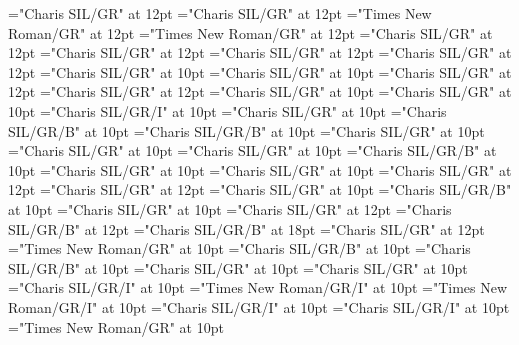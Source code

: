 \documentclass[a4paper,twoside]{article}
\begin{document}
\pagestyle{plain}
\sloppy
\setlength{\parfillskip}{0pt plus 1fil}
\font\diven="Charis SIL/GR" at 12pt
\font\spanen="Charis SIL/GR" at 12pt
\font\divpt="Times New Roman/GR" at 12pt
\font\spanpt="Times New Roman/GR" at 12pt
\font\divseh="Charis SIL/GR" at 12pt
\font\spanseh="Charis SIL/GR" at 12pt
\font\divsehfonipaxetic="Charis SIL/GR" at 12pt
\font\spansehfonipaxetic="Charis SIL/GR" at 12pt
\font\xitemen="Charis SIL/GR" at 10pt
\font\xitemxitemcomplexformrefsbefore="Charis SIL/GR" at 10pt
\font\xitemxitemdefinitionbefore="Charis SIL/GR" at 12pt
\font\xitemxitemdefinitionLcbefore="Charis SIL/GR" at 12pt
\font\xitemxitementryrefcomponentbefore="Charis SIL/GR" at 10pt
\font\xitemxitementryreftypebefore="Charis SIL/GR" at 10pt
\font\xitemxitemexamplebefore="Charis SIL/GR/I" at 10pt
\font\xitemxitemexamplesbefore="Charis SIL/GR" at 10pt
\font\xitemxitemheadwordbefore="Charis SIL/GR/B" at 10pt
\font\xitemxitemLexEntrypublishStemComponentTargetHeadWordRefbefore="Charis SIL/GR/B" at 10pt
\font\xitemxitemlexreftargetsbefore="Charis SIL/GR" at 10pt
\font\xitemxitemprimaryrefsbefore="Charis SIL/GR" at 10pt
\font\xitemxitemrelationsbefore="Charis SIL/GR" at 10pt
\font\xitemxitemsensecrossrefbefore="Charis SIL/GR/B" at 10pt
\font\sensesensesensesbefore="Charis SIL/GR" at 10pt
\font\sensesensesubsensesbefore="Charis SIL/GR" at 10pt
\font\xitemxitemtranslationbefore="Charis SIL/GR" at 12pt
\font\xitemxitemtranslationLcbefore="Charis SIL/GR" at 12pt
\font\xitemxitemvariantrefentrytypebefore="Charis SIL/GR" at 10pt
\font\xitemxitemvariantrefformbefore="Charis SIL/GR/B" at 10pt
\font\xitemxitemvariantrefsbefore="Charis SIL/GR" at 10pt
\font\xitemtpi="Charis SIL/GR" at 12pt
\font{}="Charis SIL/GR/B" at 12pt
\font{}="Charis SIL/GR/B" at 18pt
\font{}="Charis SIL/GR" at 12pt
\font\entryletDatadicBody="Times New Roman/GR" at 10pt
\font\headwordsehentryletDatadicBody="Charis SIL/GR/B" at 10pt
\font\spanenheadwordsehentryletDatadicBody="Charis SIL/GR/B" at 10pt
\font\sensesentryletDatadicBody="Charis SIL/GR" at 10pt
\font\sensesensesentryletDatadicBody="Charis SIL/GR" at 10pt
\font\grammaticalinfosensesensesentryletDatadicBody="Charis SIL/GR/I" at 10pt
\font\partofspeechptgrammaticalinfosensesensesentryletDatadicBody="Times New Roman/GR/I" at 10pt
\font\spanptpartofspeechptgrammaticalinfosensesensesentryletDatadicBody="Times New Roman/GR/I" at 10pt
\font\spanenpartofspeechptgrammaticalinfosensesensesentryletDatadicBody="Charis SIL/GR/I" at 10pt
\font\spanengrammaticalinfosensesensesentryletDatadicBody="Charis SIL/GR/I" at 10pt
\font{}="Times New Roman/GR" at 10pt
\end{document}
